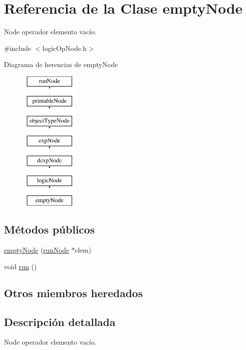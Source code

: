 \hypertarget{classemptyNode}{\section{Referencia de la Clase empty\-Node}
\label{classemptyNode}
}


Node operador elemento vacío.  




{\ttfamily \#include $<$logic\-Op\-Node.\-h$>$}

Diagrama de herencias de empty\-Node\begin{figure}[H]
\begin{center}
\leavevmode
\includegraphics[height=7.000000cm]{classemptyNode}
\end{center}
\end{figure}
\subsection*{Métodos públicos}
\begin{DoxyCompactItemize}
\item 
\hyperlink{classemptyNode_a79b0e2d5d9eb82467c4c9c5d27f6f2e5}{empty\-Node} (\hyperlink{classrunNode}{run\-Node} $\ast$elem)
\item 
void \hyperlink{classemptyNode_ab86f4f2c21cd278bf4d1c07b8d7539a3}{run} ()
\end{DoxyCompactItemize}
\subsection*{Otros miembros heredados}


\subsection{Descripción detallada}
Node operador elemento vacío. 

